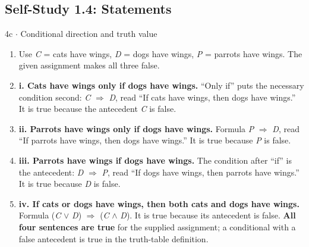 \documentclass[11pt]{article}
\begin{document}
\begin{keepsection}\subsection{Self-Study 1.4: Statements}

\begin{workedbox}{4c \ensuremath{\cdot} Conditional direction and truth value}
\begin{enumerate}
\item Use \textit{C} = cats have wings, \textit{D} = dogs have wings, \textit{P} = parrots have wings. The given assignment makes all three false.
\item \textbf{i. Cats have wings only if dogs have wings.} “Only if” puts the necessary condition second: \textit{C} \ensuremath{\Rightarrow} \textit{D}, read “If cats have wings, then dogs have wings.” It is true because the antecedent \textit{C} is false.
\item \textbf{ii. Parrots have wings only if dogs have wings.} Formula \textit{P} \ensuremath{\Rightarrow} \textit{D}, read “If parrots have wings, then dogs have wings.” It is true because \textit{P} is false.
\item \textbf{iii. Parrots have wings if dogs have wings.} The condition after “if” is the antecedent: \textit{D} \ensuremath{\Rightarrow} \textit{P}, read “If dogs have wings, then parrots have wings.” It is true because \textit{D} is false.
\item \textbf{iv. If cats or dogs have wings, then both cats and dogs have wings.} Formula (\textit{C} \ensuremath{\lor} \textit{D}) \ensuremath{\Rightarrow} (\textit{C} \ensuremath{\land} \textit{D}). It is true because its antecedent is false. \textbf{All four sentences are true} for the supplied assignment; a conditional with a false antecedent is true in the truth-table definition.
\end{enumerate}
\end{workedbox}

\end{keepsection}
\end{document}
